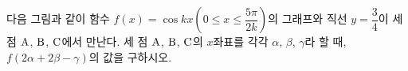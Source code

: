 다음 그림과 같이 함수 $f(x)=\cos kx\left(0\le x\le\dfrac{5\pi}{2k}\right)$의 그래프와 직선 $y=\dfrac{3}{4}$이 세 점 $\mathrm{A}$, $\mathrm{B}$, $\mathrm{C}$에서 만난다. 세 점 $\mathrm{A}$, $\mathrm{B}$, $\mathrm{C}$의 $x$좌표를 각각 $\alpha$, $\beta$, $\gamma$라 할 때, $f(2\alpha+2\beta-\gamma)$의 값을 구하시오. 
\par\smallskip\begin{center}\resizebox{\ifdim\width>\linewidth\linewidth\else\width\fi}{!}{}\end{center}
